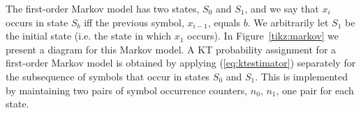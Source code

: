 \vspace{+5pt}


\begin{table}[h]
\begin{minipage}{0.62\textwidth}
The first-order Markov model has two states, $S_0$ and $S_1$, and we say that $x_i$ occurs in state $S_b$ iff the previous symbol, $x_{i-1}$, equals $b$. We arbitrarily let $S_1$ be the initial state (i.e. the state in which $x_1$ occurs). In Figure~\ref{tikz:markov} we present a diagram for this Markov model. A KT probability assignment for a first-order Markov model is obtained by applying (\ref{eq:ktestimator}) separately for the subsequence of symbols that occur in states $S_0$ and $S_1$. This is implemented by maintaining two pairs of symbol occurrence counters, $n_0$, $n_1$, one pair for each state.

\end{minipage}
\hspace{0.02\textwidth}
\begin{minipage}{0.32\textwidth}

\end{minipage}
\end{table}

